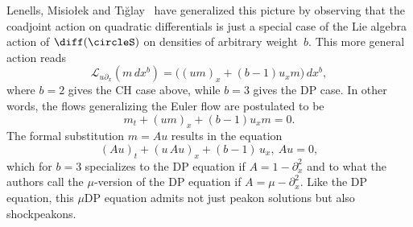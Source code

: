 \documentclass[10pt,a4paper]{article} \pdfoutput=1 
\begin{document}
Lenells, Misiołek and Tığlay~\cite{lenells-misiolek-tiglay:2010:evolution-equations-tensor-densities-peakons}
have generalized this picture by observing that the coadjoint action on quadratic
differentials is just a special case of the Lie algebra action of $\diff(\circleS)$ on densities of
arbitrary weight~$b$.
This more general action reads
\begin{equation*}
  \mathcal{L}_{u\partial_x} (m \, dx^b)
  = \bigl( (um)_x + (b-1) u_x m \bigr) \, dx^b
  ,
\end{equation*}
where $b=2$ gives the CH case above, while $b=3$ gives the DP case.
In other words, the flows generalizing the Euler flow are postulated to be
\begin{equation*}
  m_t + (um)_x + (b-1) u_x m = 0
  .
\end{equation*}
The formal substitution $m=Au$ results in the equation
\begin{equation*}
  (Au)_t + (u \, Au)_x + (b-1) \, u_x ,\ Au = 0
  ,
\end{equation*}
which for $b=3$ specializes to the DP equation if $A = 1 - \partial_x^2$
and to what the authors call the $\mu$-version of the DP equation if $A = \mu - \partial_x^2$.
Like the DP equation, this $\mu$DP equation admits not just peakon solutions but also shockpeakons.
\end{document}
